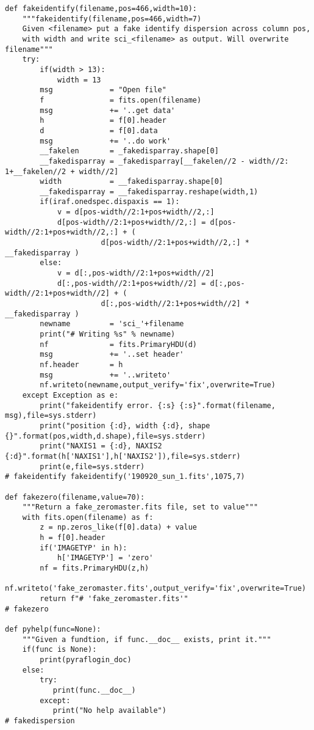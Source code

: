 {\begin{verbatim}
def fakeidentify(filename,pos=466,width=10):
    """fakeidentify(filename,pos=466,width=7)
    Given <filename> put a fake identify dispersion across column pos,
    with width and write sci_<filename> as output. Will overwrite filename"""
    try:
        if(width > 13):
            width = 13
        msg             = "Open file"
        f               = fits.open(filename)
        msg             += '..get data'
        h               = f[0].header
        d               = f[0].data
        msg             += '..do work'
        __fakelen       = _fakedisparray.shape[0]
        __fakedisparray = _fakedisparray[__fakelen//2 - width//2: 1+__fakelen//2 + width//2]
        width           = __fakedisparray.shape[0]
        __fakedisparray = __fakedisparray.reshape(width,1)
        if(iraf.onedspec.dispaxis == 1):
            v = d[pos-width//2:1+pos+width//2,:]
            d[pos-width//2:1+pos+width//2,:] = d[pos-width//2:1+pos+width//2,:] + (
                      d[pos-width//2:1+pos+width//2,:] * __fakedisparray )
        else:
            v = d[:,pos-width//2:1+pos+width//2]
            d[:,pos-width//2:1+pos+width//2] = d[:,pos-width//2:1+pos+width//2] + (
                      d[:,pos-width//2:1+pos+width//2] * __fakedisparray )
        newname         = 'sci_'+filename
        print("# Writing %s" % newname)
        nf              = fits.PrimaryHDU(d)
        msg             += '..set header'
        nf.header       = h
        msg             += '..writeto'
        nf.writeto(newname,output_verify='fix',overwrite=True)
    except Exception as e:
        print("fakeidentify error. {:s} {:s}".format(filename, msg),file=sys.stderr)
        print("position {:d}, width {:d}, shape {}".format(pos,width,d.shape),file=sys.stderr)
        print("NAXIS1 = {:d}, NAXIS2 {:d}".format(h['NAXIS1'],h['NAXIS2']),file=sys.stderr)
        print(e,file=sys.stderr)
# fakeidentify fakeidentify('190920_sun_1.fits',1075,7)

def fakezero(filename,value=70):
    """Return a fake_zeromaster.fits file, set to value"""
    with fits.open(filename) as f:
        z = np.zeros_like(f[0].data) + value
        h = f[0].header
        if('IMAGETYP' in h):
            h['IMAGETYP'] = 'zero'
        nf = fits.PrimaryHDU(z,h)
        nf.writeto('fake_zeromaster.fits',output_verify='fix',overwrite=True)
        return f"# 'fake_zeromaster.fits'"
# fakezero

def pyhelp(func=None):
    """Given a fundtion, if func.__doc__ exists, print it."""
    if(func is None):
        print(pyraflogin_doc)
    else:
        try:
           print(func.__doc__)
        except:
           print("No help available")
# fakedispersion


\end{verbatim}}
